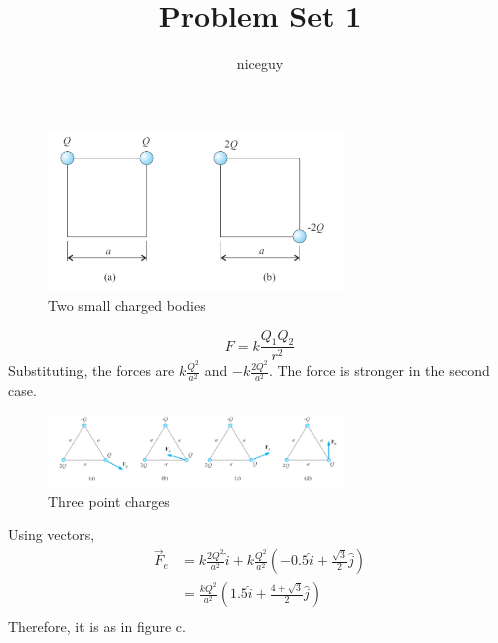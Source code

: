 \documentclass[answers]{exam}
\author{niceguy}
\title{Problem Set 1}
\begin{document}
\maketitle
\begin{questions}


\begin{figure}
	\centering
	\includegraphics[width=0.7\textwidth]{1.png}
	\caption{Two small charged bodies}
	\label{1}
\end{figure}

\begin{solution}
	$$F = k\frac{Q_1Q_2}{r^2}$$
	Substituting, the forces are $k\frac{Q^2}{a^2}$ and $-k\frac{2Q^2}{a^2}$. The force is stronger in the second case.
\end{solution}


\begin{figure}
	\centering
	\includegraphics[width=0.7\textwidth]{2.png}
	\caption{Three point charges}
	\label{2}
\end{figure}

\begin{solution}
	Using vectors,
	\begin{align*}
		\vec{F}_e &= k\frac{2Q^2}{a^2}\hat{i} + k\frac{Q^2}{a^2}\left(-0.5\hat{i} + \frac{\sqrt{3}}{2}\hat{j}\right) \\
			  &= \frac{kQ^2}{a^2} \left(1.5\hat{i} + \frac{4+\sqrt{3}}{2}\hat{j}\right) \\
	\end{align*}
	Therefore, it is as in figure c.
\end{solution}


\end{questions}
\end{document}
